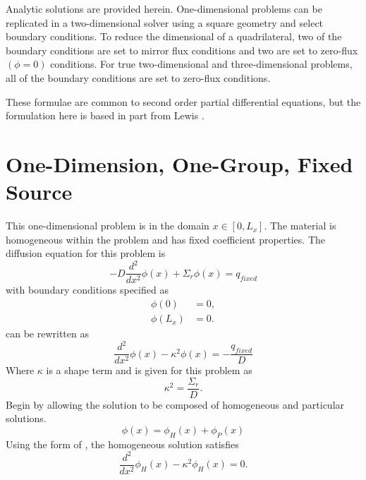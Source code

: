   Analytic solutions are provided herein. One-dimensional problems can be 
  replicated in a two-dimensional solver using a square geometry and select 
  boundary conditions. To reduce the dimensional of a quadrilateral, two of the 
  boundary conditions are set to mirror flux conditions and two are set to 
  zero-flux $(\phi = 0)$ conditions. For true two-dimensional and three-dimensional 
  problems, all of the boundary conditions are set to zero-flux conditions.
  
  These formulae are common to second order partial differential equations, but
  the formulation here is based in part from Lewis \cite{textbooklewis}.

\section{One-Dimension, One-Group, Fixed Source}
  \label{sec:deriv_1dfixedsrc}
  This one-dimensional problem is in the domain $x \in [0,L_x]$. The material is
  homogeneous within the problem and has fixed coefficient properties.
  The diffusion equation for this problem is 
  \begin{equation}
    \label{eq:1dfixed}
    -D \frac{d^2}{dx^2} \phi(x) + \Sigma_r \phi(x) = q_{fixed}
  \end{equation}
  with boundary conditions specified as
  \begin{align}
    \label{eq:1dfixed_bc1}
    \phi(0) &= 0, \\
    \label{eq:1dfixed_bc2}
    \phi(L_x) &= 0.
  \end{align}
   can be rewritten as
  \begin{equation}
    \label{eq:1dfixed_buckle}
    \frac{d^2}{dx^2} \phi(x) - \kappa^2 \phi(x) = - \frac{q_{fixed}}{D}
  \end{equation}
  Where $\kappa$ is a shape term and is given for this problem as
  \begin{equation}
    \label{eq:1dfixed_b2}
    \kappa^2 = \frac{\Sigma_r}{D}.
  \end{equation}
  Begin by allowing the solution to be composed of homogeneous and particular
  solutions. 
  \begin{equation} 
    \phi(x) = \phi_H(x) + \phi_P(x)
  \end{equation}
  Using the form of , the homogeneous solution satisfies 
  \begin{equation}
    \label{eq:1dfixed_homog}
    \frac{d^2}{dx^2} \phi_H(x) - \kappa^2 \phi_H(x) = 0.
  \end{equation}

